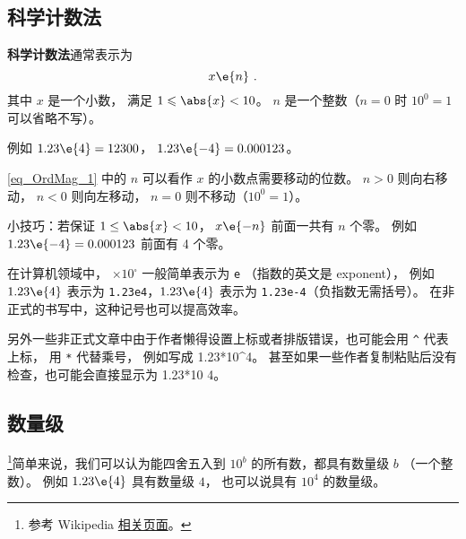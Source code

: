 
\begin{issues}
\issueDraft
\end{issues}

\subsection{科学计数法}
\textbf{科学计数法}通常表示为
\begin{equation}\label{eq_OrdMag_1}
x \e{n}~.
\end{equation}
其中 $x$ 是一个小数， 满足 $1 \leqslant \abs{x} < 10$。 $n$ 是一个整数（$n=0$ 时 $10^{0} = 1$ 可以省略不写）。

例如 $1.23\e{4} = 12300$， $1.23\e{-4} = 0.000123$。

\autoref{eq_OrdMag_1} 中的 $n$ 可以看作 $x$ 的小数点需要移动的位数。 $n > 0$ 则向右移动， $n < 0$ 则向左移动， $n=0$ 则不移动（$10^{0} = 1$）。

小技巧：若保证 $1 \le \abs{x} < 10$， $x\e{-n}$ 前面一共有 $n$ 个零。 例如 $1.23\e{-4} = 0.000123$ 前面有 4 个零。

在计算机领域中， $\times 10^\square$ 一般简单表示为 \verb`e` （指数的英文是 exponent）， 例如 $1.23\e{4}$ 表示为 \verb`1.23e4`，$1.23\e{4}$ 表示为 \verb`1.23e-4`（负指数无需括号）。 在非正式的书写中，这种记号也可以提高效率。

另外一些非正式文章中由于作者懒得设置上标或者排版错误，也可能会用 \verb`^` 代表上标， 用 \verb`*` 代替乘号， 例如写成 1.23*10^4。 甚至如果一些作者复制粘贴后没有检查，也可能会直接显示为 1.23*10 4。

\subsection{数量级}
\footnote{参考 Wikipedia \href{https://en.wikipedia.org/wiki/Order_of_magnitude}{相关页面}。}简单来说，我们可以认为能四舍五入到 $10^b$ 的所有数，都具有数量级 $b$ （一个整数）。 例如 $1.23\e{4}$ 具有数量级 $4$， 也可以说具有 $10^4$ 的数量级。
